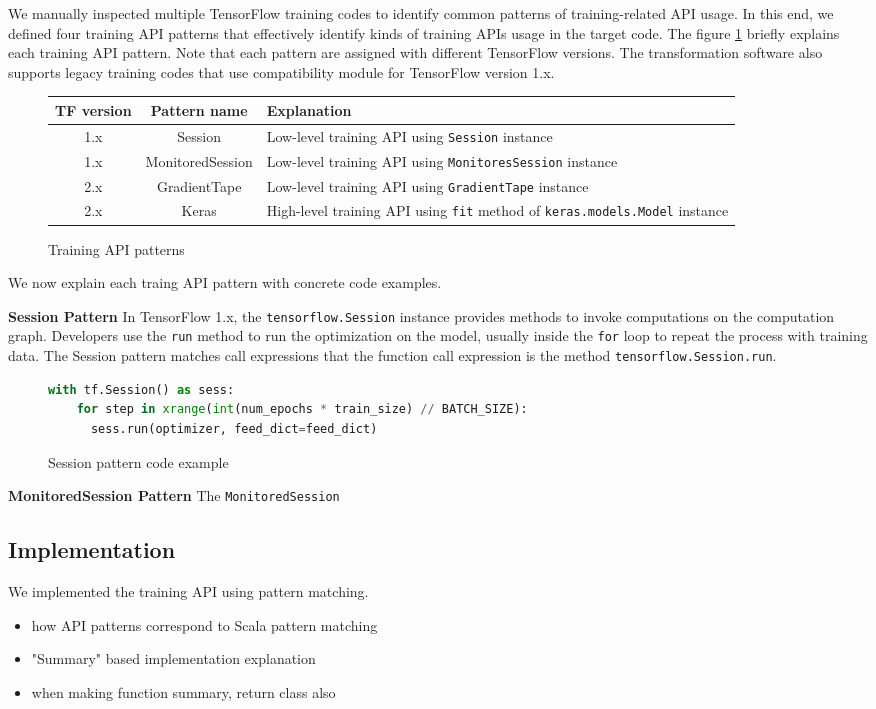 We manually inspected multiple TensorFlow training codes to identify
common patterns of training-related API usage. 
In this end, we defined four training API patterns
that effectively identify kinds of training APIs usage in the target code.
The figure \ref{tab:patterns} briefly explains each training API pattern.
Note that each pattern are assigned with different TensorFlow versions.
The transformation software also supports legacy training codes
that use compatibility module for TensorFlow version 1.x.

\begin{figure}
  \centering
  \begin{tabular}{|c|c|l|}
    \hline
    TF version & Pattern name & Explanation \\
    \hline
    1.x & Session & Low-level training API using {\tt Session} instance\\
    \hline
    1.x & MonitoredSession & Low-level training API using {\tt MonitoresSession} instance \\
    \hline
    2.x & GradientTape & Low-level training API using {\tt GradientTape} instance\\
    \hline
    2.x & Keras & High-level training API using {\tt fit} method of {\tt keras.models.Model} instance\\
    \hline
  \end{tabular}
  \caption{Training API patterns}
  \label{tab:patterns}
\end{figure}

We now explain each traing API pattern with concrete code examples.

\textbf{Session Pattern} 
In TensorFlow 1.x, the {\tt tensorflow.Session} instance provides methods to
invoke computations on the computation graph.
Developers use the {\tt run} method to run the optimization on the model,
usually inside the {\tt for} loop to repeat the process with training data.
The Session pattern matches call expressions that the function
call expression is the method {\tt tensorflow.Session.run}.

\begin{figure}
\begin{lstlisting}[language=Python]
with tf.Session() as sess:
    for step in xrange(int(num_epochs * train_size) // BATCH_SIZE):
      sess.run(optimizer, feed_dict=feed_dict)
\end{lstlisting}
\caption{Session pattern code example}
\end{figure}

\textbf{MonitoredSession Pattern}
The {\tt MonitoredSession}


\subsection{Implementation}

We implemented the training API using pattern matching.

\begin{itemize}
  \item how API patterns correspond to Scala pattern matching
  \item "Summary" based implementation explanation 
  \item when making function summary, return class also
\end{itemize}
